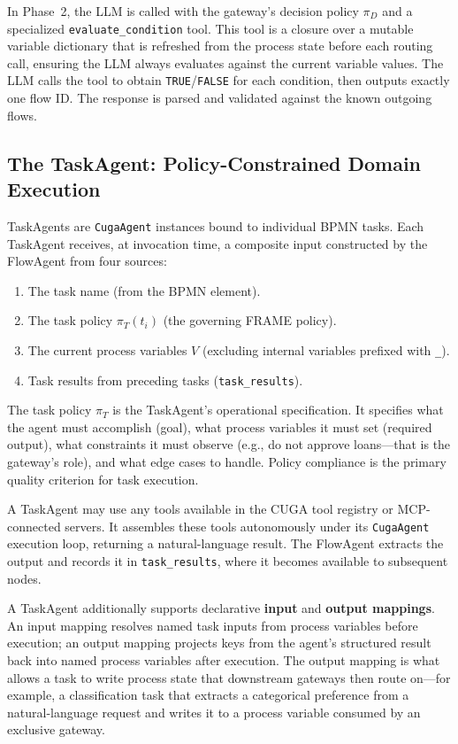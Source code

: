 \documentclass[11pt,a4paper]{article}
\begin{document}
In Phase~2, the LLM is called with the gateway's decision policy $\pi_D$ and a
specialized \texttt{evaluate\_condition} tool. This tool is a closure over a
mutable variable dictionary that is refreshed from the process state before each
routing call, ensuring the LLM always evaluates against the current variable
values. The LLM calls the tool to obtain \texttt{TRUE}/\texttt{FALSE} for each
condition, then outputs exactly one flow ID. The response is parsed and validated
against the known outgoing flows.

\subsection{The TaskAgent: Policy-Constrained Domain Execution}

TaskAgents are \texttt{CugaAgent} instances bound to individual BPMN tasks.
Each TaskAgent receives, at invocation time, a composite input constructed by
the FlowAgent from four sources:

\begin{enumerate}[noitemsep, label=(\roman*)]
  \item The task name (from the BPMN element).
  \item The task policy $\pi_T(t_i)$ (the governing FRAME policy).
  \item The current process variables $V$ (excluding internal variables prefixed
        with \texttt{\_}).
  \item Task results from preceding tasks (\texttt{task\_results}).
\end{enumerate}

The task policy $\pi_T$ is the TaskAgent's operational specification. It specifies
what the agent must accomplish (goal), what process variables it must set (required
output), what constraints it must observe (e.g., do not approve loans—that is the
gateway's role), and what edge cases to handle. Policy compliance is the primary
quality criterion for task execution.

A TaskAgent may use any tools available in the CUGA tool registry or MCP-connected
servers. It assembles these tools autonomously under its \texttt{CugaAgent} execution
loop, returning a natural-language result. The FlowAgent extracts the output and
records it in \texttt{task\_results}, where it becomes available to subsequent nodes.

A TaskAgent additionally supports declarative \textbf{input} and \textbf{output
mappings}. An input mapping resolves named task inputs from process variables before
execution; an output mapping projects keys from the agent's structured result back
into named process variables after execution. The output mapping is what allows a
task to write process state that downstream gateways then route on---for example, a
classification task that extracts a categorical preference from a natural-language
request and writes it to a process variable consumed by an exclusive gateway.
\end{document}
